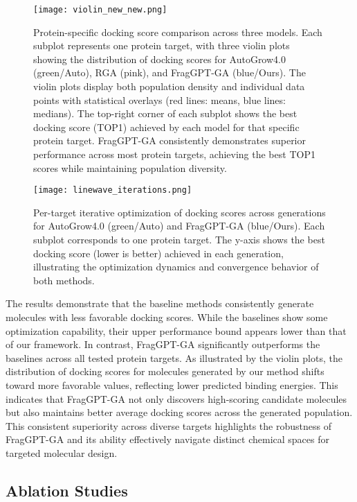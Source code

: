 \documentclass[lettersize,journal]{IEEEtran}
\begin{document}
\begin{figure*}[!t]
\centering
\texttt{[image: violin\_new\_new.png]}
\caption{Protein-specific docking score comparison across three models. Each subplot represents one protein target, with three violin plots showing the distribution of docking scores for AutoGrow4.0 (green/Auto), RGA (pink), and FragGPT-GA (blue/Ours). The violin plots display both population density and individual data points with statistical overlays (red lines: means, blue lines: medians). The top-right corner of each subplot shows the best docking score (TOP1) achieved by each model for that specific protein target. FragGPT-GA consistently demonstrates superior performance across most protein targets, achieving the best TOP1 scores while maintaining population diversity.}
\label{fig:violin_comparison}
\end{figure*}

\begin{figure*}[!t]
\centering
\texttt{[image: linewave\_iterations.png]}
\caption{Per-target iterative optimization of docking scores across generations for AutoGrow4.0 (green/Auto) and FragGPT-GA (blue/Ours). Each subplot corresponds to one protein target. The y-axis shows the best docking score (lower is better) achieved in each generation, illustrating the optimization dynamics and convergence behavior of both methods.}
\label{fig:linewave_iterations}
\end{figure*}

The results demonstrate that the baseline methods consistently generate molecules with less favorable docking scores. While the baselines show some optimization capability, their upper performance bound appears lower than that of our framework. In contrast, FragGPT-GA significantly outperforms the baselines across all tested protein targets. As illustrated by the violin plots, the distribution of docking scores for molecules generated by our method shifts toward more favorable values, reflecting lower predicted binding energies. This indicates that FragGPT-GA not only discovers high-scoring candidate molecules but also maintains better average docking scores across the generated population. This consistent superiority across diverse targets highlights the robustness of FragGPT-GA and its ability effectively navigate distinct chemical spaces for targeted molecular design.


\subsection{Ablation Studies}
\end{document}

